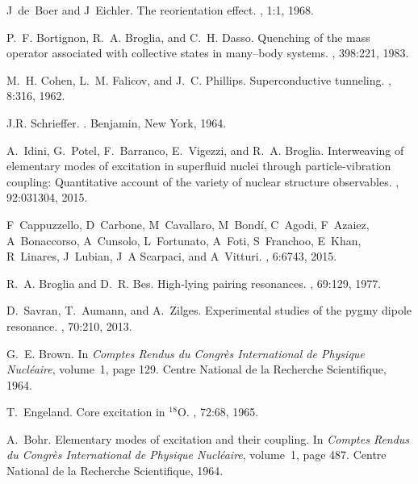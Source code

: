 \documentclass[a4paper,11pt]{article}
\numberwithin{equation}{section}
\numberwithin{figure}{section}
\numberwithin{table}{section}
\begin{document}
\begin{thebibliography}{10}
	J~de~Boer and J~Eichler.
	\newblock The reorientation effect.
	, 1:1, 1968.
	
	P.~F. Bortignon, R.~A. Broglia, and C.~H. Dasso.
	\newblock Quenching of the mass operator associated with collective states in
	many--body systems.
	, 398:221, 1983.
	
	M.~H. Cohen, L.~M. Falicov, and J.~C. Phillips.
	\newblock Superconductive tunneling.
	, 8:316, 1962.
	
	J.R. Schrieffer.
	.
	\newblock Benjamin, New York, 1964.
	
	A.~Idini, G.~Potel, F.~Barranco, E.~Vigezzi, and R.~A. Broglia.
	\newblock Interweaving of elementary modes of excitation in superfluid nuclei
	through particle-vibration coupling: Quantitative account of the variety of
	nuclear structure observables.
	, 92:031304, 2015.
	
	F~Cappuzzello, D~Carbone, M~Cavallaro, M~{Bond\'i}, C~Agodi, F~Azaiez,
	A~Bonaccorso, A~Cunsolo, L~Fortunato, A~Foti, S~Franchoo, E~Khan, R~Linares,
	J~Lubian, J~A Scarpaci, and A~Vitturi.
	, 6:6743, 2015.
	
	R.~A. Broglia and D.~R. Bes.
	\newblock High-lying pairing resonances.
	, 69:129, 1977.
	
	D.~Savran, T.~Aumann, and A.~Zilges.
	\newblock Experimental studies of the pygmy dipole resonance.
	, 70:210, 2013.
	
	G.~E. Brown.
	\newblock In {\em {Comptes Rendus du Congr\`{e}s International de Physique
			Nucl\'{e}aire}}, volume~1, page 129. Centre National de la Recherche
	Scientifique, 1964.
	
	T.~Engeland.
	\newblock Core excitation in {$^{18}$O}.
	, 72:68, 1965.
	
	A.~Bohr.
	\newblock Elementary modes of excitation and their coupling.
	\newblock In {\em {Comptes Rendus du Congr\`{e}s International de Physique
			Nucl\'{e}aire}}, volume~1, page 487. Centre National de la Recherche
	Scientifique, 1964.
	

\end{thebibliography}
\end{document}
